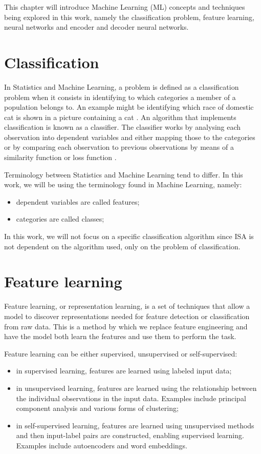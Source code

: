 
This chapter will introduce Machine Learning (ML) concepts and techniques being explored in this work, namely the classification problem, feature learning, neural networks and encoder and decoder neural networks.

\section{Classification}

In Statistics and Machine Learning, a problem is defined as a classification problem when it consists in identifying to which categories a member of a population belongs to. An example might be identifying which race of domestic cat is shown in a picture containing a cat \cite{Kolla2020}. An algorithm that implements classification is known as a classifier. The classifier works by analysing each observation into dependent variables and either mapping those to the categories or by comparing each observation to previous observations by means of a similarity function or loss function \cite{lorena2021inteligencia}. 

Terminology between Statistics and Machine Learning tend to differ. In this work, we will be using the terminology found in Machine Learning, namely:

\begin{itemize}
	\item dependent variables are called features;
	\item categories are called classes;
\end{itemize}

In this work, we will not focus on a specific classification algorithm since ISA is not dependent on the algorithm used, only on the problem of classification.

\section{Feature learning} \label{sec:feature_learning}

Feature learning, or representation learning\cite{RepLearning}, is a set of techniques that allow a model to discover representations needed for feature detection or classification from raw data. This is a method by which we replace feature engineering and have the model both learn the features and use them to perform the task.

Feature learning can be either supervised, unsupervised or self-supervised:

\begin{itemize}
	\item in supervised learning, features are learned using labeled input data;
	\item in unsupervised learning, features are learned using the relationship between the individual observations in the input data. Examples include principal component analysis and various forms of clustering;
	\item in self-supervised learning, features are learned using unsupervised methods and then input-label pairs are constructed, enabling supervised learning. Examples include autoencoders and word embeddings.
\end{itemize}	

